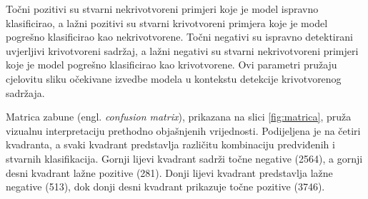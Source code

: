 \documentclass[seminarski, times, utf8]{fer}
\begin{document}
\setcounter{subfigure}{0}
\begin{figure}[H]
   \centering


\end{figure}

Točni pozitivi su stvarni nekrivotvoreni primjeri koje je model ispravno klasificirao, a lažni pozitivi su stvarni krivotvoreni primjera koje je model pogrešno klasificirao kao nekrivotvorene. Točni negativi su ispravno detektirani uvjerljivi krivotvoreni sadržaj, a lažni negativi su stvarni nekrivotvoreni primjeri koje je model pogrešno klasificirao kao krivotvorene. Ovi parametri pružaju cjelovitu sliku očekivane izvedbe modela u kontekstu detekcije krivotvorenog sadržaja.

Matrica zabune (engl. \textit{confusion matrix}), prikazana na slici \ref{fig:matrica}, pruža vizualnu interpretaciju prethodno objašnjenih vrijednosti. Podijeljena je na četiri kvadranta, a svaki kvadrant predstavlja različitu kombinaciju predviđenih i stvarnih klasifikacija. Gornji lijevi kvadrant sadrži točne negative (2564), a gornji desni kvadrant lažne pozitive (281). Donji lijevi kvadrant predstavlja lažne negative (513), dok donji desni kvadrant prikazuje točne pozitive (3746).
\end{document}
